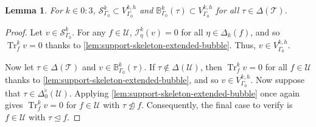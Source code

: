 \documentclass[10pt,a4paper]{amsart}
\newtheorem{lemma}{Lemma}
\DeclareMathOperator{\Tr}{Tr}
\newcommand{\boundarymesh}[0]{\mathcal{U}}
\newcommand{\mesh}[0]{\mathcal{T}}
\DeclareMathOperator{\notsubsimplex}{\ntrianglelefteq}
\DeclareMathOperator{\subsimplex}{\unlhd}
\begin{document}
\begin{lemma}
	For $k \in 0:3$, $\mathcal{S}^k_{\Gamma_0} \subset V_{\Gamma_0}^{k, h}$
	and $\mathbb{B}_{\Gamma_0}^k(\tau) \subset V_{\Gamma_0}^{k, h}$ for all 
	$\tau \in \Delta(\mesh)$.
\end{lemma}

\begin{proof}
	Let $v \in \mathcal{S}^k_{\Gamma_0}$. For any $f \in \boundarymesh$,
	$\mathcal{I}^k_{\eta}(v) = 0$ for all $\eta \in \Delta_k(f)$, and so 
	$\Tr^k_{f} v = 0$ thanks to 
	\cref{lem:support-skeleton-extended-bubble}. 
	Thus, $v \in V_{\Gamma_0}^{k, h}$.
	
	Now let $\tau \in \Delta(\mesh)$ and 
	$v \in \mathbb{B}_{\Gamma_0}^k(\tau)$. 
	If $\tau \notin \Delta(\boundarymesh)$,
	then $\Tr^k_{f} v = 0$ for all $f \in \boundarymesh$
	thanks to \cref{lem:support-skeleton-extended-bubble},
	and so $v \in V_{\Gamma_0}^{k, h}$. Now suppose that 
	$\tau \in \Delta_0^{\flat}(\boundarymesh)$. Applying 
	\cref{lem:support-skeleton-extended-bubble} once again gives 
	$\Tr_{f}^k v = 0$ for $f \in \boundarymesh$
	with $\tau \notsubsimplex f$. Consequently, the final case to verify 
	is $f \in \boundarymesh$ with $\tau \subsimplex f$.
	

\end{proof}
\end{document}
